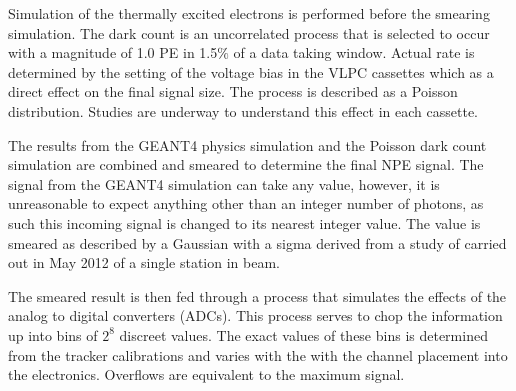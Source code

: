   Simulation of the thermally excited electrons is performed before the smearing simulation.  The dark count is an uncorrelated process that is selected to occur with a magnitude of 1.0 PE in 1.5$\%$ of a data taking window.  Actual rate is determined by the setting of the voltage bias in the VLPC cassettes which as a direct effect on the final signal size.  The process is described as a Poisson distribution.  Studies are underway to understand this effect in each cassette. 
  
  The results from the GEANT4 physics simulation and the Poisson dark count simulation are combined and smeared to determine the final NPE signal.  The signal from the GEANT4 simulation can take any value, however, it is unreasonable to expect anything other than an integer number of photons, as such this incoming signal is changed to its nearest integer value. The value is smeared as described by a Gaussian with a sigma derived from a study of carried out in May 2012 of a single station in beam.
  
  The smeared result is then fed through a process that simulates the effects of the analog to digital converters (ADCs).  This process serves to chop the information up into bins of $2^8$ discreet values.  The exact values of these bins is determined from the tracker calibrations and varies with the with the channel placement into the electronics.  Overflows are equivalent to the maximum signal.  